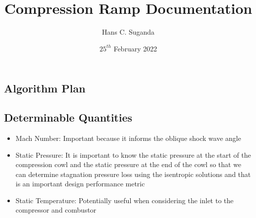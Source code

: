 \documentclass[a4paper, 12pt]{report}
\let\stdsection\section
\renewcommand\section{\newpage\stdsection}
\begin{document}
\title{Compression Ramp Documentation}
\author{Hans C. Suganda}
\date{$25^{th}$ February 2022}
\newpage



\begin{center}

\section{Algorithm Plan}
\begin{comment}
\end{comment}

\subsection{Determinable Quantities}
\begin{comment}
\end{comment}
\begin{itemize}
\item Mach Number: Important because it informs the oblique shock wave angle
\item Static Pressure: It is important to know the static pressure at the start of the compression cowl and the static pressure at the end of the cowl so that we can determine stagnation pressure loss using the isentropic solutions and that is an important design performance metric
\item Static Temperature: Potentially useful when considering the inlet to the compressor and combustor
\end{itemize}


\end{center}
\end{document}
